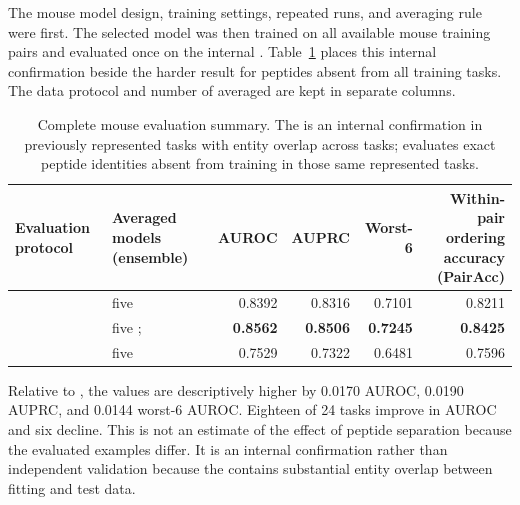 The mouse model design, training settings, repeated runs, and averaging rule were \plainFrozen{} first. The selected model was then trained on all available mouse training pairs and evaluated once on the internal \plainFixedTest{}. Table~\ref{tab:mouse-protocol-summary} places this internal confirmation beside the harder result for peptides absent from all training tasks. The data protocol and number of averaged \plainSeeds{} are kept in separate columns.

\begin{table}[tbp]
\centering
\caption{Complete mouse evaluation summary. The \plainFixedTest{} is an internal confirmation in previously represented tasks with entity overlap across tasks; \plainPeptideOOF{} evaluates exact peptide identities absent from training in those same represented tasks.}
\label{tab:mouse-protocol-summary}
\footnotesize
\setlength{\tabcolsep}{2pt}
\begin{tabularx}{\textwidth}{>{\raggedright\arraybackslash}X
                            >{\raggedright\arraybackslash}Xrrrr}
\toprule
Evaluation protocol & Averaged models (ensemble) & AUROC & AUPRC & Worst-6 & \shortstack{Within-pair ordering\\accuracy (PairAcc)} \\ 
\midrule
\plainMatchedOOF{} & five \plainSeeds{} & 0.8392 & 0.8316 & 0.7101 & 0.8211 \\ 
\plainFixedTest{} & five \plainSeeds{}; \plainFrozen{} & \textbf{0.8562} & \textbf{0.8506} & \textbf{0.7245} & \textbf{0.8425} \\ 
\plainPeptideOOF{} & five \plainSeeds{} & 0.7529 & 0.7322 & 0.6481 & 0.7596 \\ 
\bottomrule
\end{tabularx}
\end{table}

Relative to \plainMatchedOOF{}, the \plainFixedTest{} values are descriptively higher by 0.0170 AUROC, 0.0190 AUPRC, and 0.0144 worst-6 AUROC. Eighteen of 24 tasks improve in AUROC and six decline. This is not an estimate of the effect of peptide separation because the evaluated examples differ. It is an internal confirmation rather than independent validation because the \plainFixedTest{} contains substantial entity overlap between fitting and test data.

